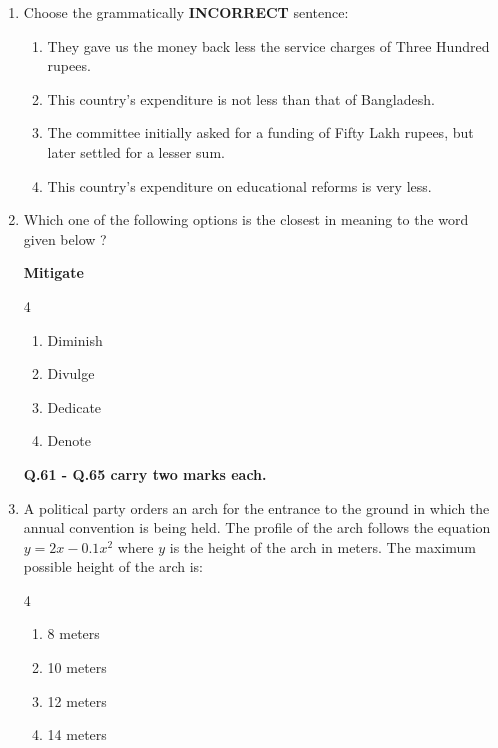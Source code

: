 \documentclass[journal]{IEEEtran}
\begin{document}
\begin{enumerate}
    \item[Q.59] Choose the grammatically \textbf{INCORRECT} sentence:

    

    \begin{enumerate}
        \item They gave us the money back less the service charges of Three Hundred rupees. 
        \item This country's expenditure is not less than that of Bangladesh. 
        \item The committee initially asked for a funding of Fifty Lakh rupees, but later settled for a lesser sum. 
        \item This country's expenditure on educational reforms is very less. 
    \end{enumerate}


    \item[Q.60] Which one of the following options is the closest in meaning to the word given below ?

    \textbf{Mitigate}
    \begin{multicols}{4}
        
    
    \begin{enumerate}
        \item Diminish
        \item Divulge
        \item Dedicate
        \item Denote
    \end{enumerate}
    \end{multicols}



\textbf{Q.61 - Q.65 carry two marks each. } \\

  \item[Q.61] A political party orders an arch for the entrance to the ground in which the annual convention is being held. The profile of the arch follows the equation $y = 2x - 0.1x^2$ where $y$ is the height of the arch in meters. The maximum possible height of the arch is:
\begin{multicols}{4}
    

    \begin{enumerate}
        \item 8 meters
        \item 10 meters
        \item 12 meters
        \item 14 meters
    \end{enumerate}
    \end{multicols}


\end{enumerate}
\end{document}
